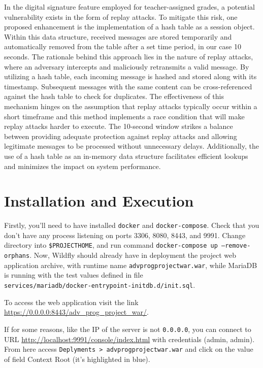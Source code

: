 In the digital signature feature employed for teacher-assigned grades, a potential vulnerability exists in the form of replay attacks. To mitigate this risk, one proposed enhancement is the implementation of a hash table as a session object. Within this data structure, received messages are stored temporarily and automatically removed from the table after a set time period, in our case 10 seconds. The rationale behind this approach lies in the nature of replay attacks, where an adversary intercepts and maliciously retransmits a valid message. By utilizing a hash table, each incoming message is hashed and stored along with its timestamp. Subsequent messages with the same content can be cross-referenced against the hash table to check for duplicates. The effectiveness of this mechanism hinges on the assumption that replay attacks typically occur within a short timeframe and this method implements a race condition that will make replay attacks harder to execute. The 10-second window strikes a balance between providing adequate protection against replay attacks and allowing legitimate messages to be processed without unnecessary delays. Additionally, the use of a hash table as an in-memory data structure facilitates efficient lookups and minimizes the impact on system performance.

\newpage
\chapter{Installation and Execution}

Firstly, you'll need to have installed \texttt{docker} and \texttt{docker-compose}. Check that you don't have any process listening on ports 3306, 8080, 8443, and 9991. Change directory into \texttt{\$PROJECT\textunderscore HOME}, and run command \texttt{docker-compose up --remove-orphans}. Now, Wildfly should already have in deployment the project web application archive, with runtime name \texttt{adv\textunderscore prog\textunderscore project\textunderscore war.war}, while MariaDB is running with the test values defined in file \\\texttt{services/mariadb/docker-entrypoint-initdb.d/init.sql}.

To access the web application visit the link \url{https://0.0.0.0:8443/adv_prog_project_war/}.

If for some reasons, like the IP of the server is not \texttt{0.0.0.0}, you can connect to URL \url{http://localhost:9991/console/index.html} with credentials (admin, admin). From here access \texttt{Deplyments > adv\textunderscore prog\textunderscore project\textunderscore war.war} and click on the value of field Context Root (it's highlighted in blue).

